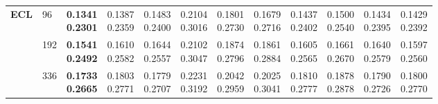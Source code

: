 \begin{longtable}{@{}llcccccccccc@{}}
\textbf{ECL} & 96 & \shortstack{\colorbox[gray]{0.82}{\textbf{0.1341}}\\\colorbox[gray]{0.82}{\textbf{0.2301}}} & \shortstack{\colorbox[gray]{0.92}{0.1387}\\\colorbox[gray]{0.92}{0.2359}} & \shortstack{0.1483\\0.2400} & \shortstack{0.2104\\0.3016} & \shortstack{0.1801\\0.2730} & \shortstack{0.1679\\0.2716} & \shortstack{0.1437\\0.2402} & \shortstack{0.1500\\0.2540} & \shortstack{0.1434\\0.2395} & \shortstack{0.1429\\0.2392} \\ \cline{2-12}

 & 192 & \shortstack{\colorbox[gray]{0.82}{\textbf{0.1541}}\\\colorbox[gray]{0.82}{\textbf{0.2492}}} & \shortstack{0.1610\\0.2582} & \shortstack{0.1644\\\colorbox[gray]{0.92}{0.2557}} & \shortstack{0.2102\\0.3047} & \shortstack{0.1874\\0.2796} & \shortstack{0.1861\\0.2884} & \shortstack{0.1605\\0.2565} & \shortstack{0.1661\\0.2670} & \shortstack{0.1640\\0.2579} & \shortstack{\colorbox[gray]{0.92}{0.1597}\\0.2560} \\ \cline{2-12}

 & 336 & \shortstack{\colorbox[gray]{0.82}{\textbf{0.1733}}\\\colorbox[gray]{0.82}{\textbf{0.2665}}} & \shortstack{0.1803\\0.2771} & \shortstack{\colorbox[gray]{0.92}{0.1779}\\\colorbox[gray]{0.92}{0.2707}} & \shortstack{0.2231\\0.3192} & \shortstack{0.2042\\0.2959} & \shortstack{0.2025\\0.3041} & \shortstack{0.1810\\0.2777} & \shortstack{0.1878\\0.2878} & \shortstack{0.1790\\0.2726} & \shortstack{0.1800\\0.2770} \\ \cline{2-12}


\end{longtable}
